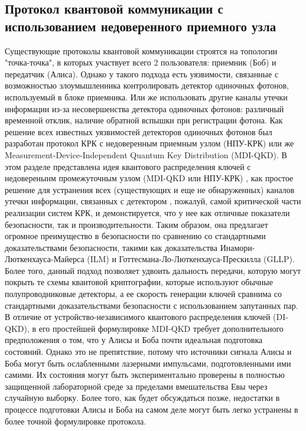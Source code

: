 \subsection{Протокол квантовой коммуникации с использованием недоверенного приемного узла} \label{sec:ch1/sect2/MDI QKD}
Существующие протоколы квантовой коммуникации строятся на топологии "точка-точка", в которых участвует всего 2 пользователя: приемник (Боб) и передатчик (Алиса). Однако у такого подхода есть уязвимости, связанные  с возможностью злоумышленника контролировать детектор одиночных фотонов, используемый в блоке приемника. \cite{makarov2009} Или же использовать другие каналы утечки информации из-за несовершенства детектора одиночных фотонов: различный временной отклик, наличие обратной вспышки при регистрации фотона. \cite{makarov2006,pinheiro2018} Как решение всех известных уязвимостей детекторов одиночных фотонов был разработан протокол КРК с недоверенным приемным узлом (НПУ-КРК) или же Measurement-Device-Independent Quantum Key Distribution (MDI-QKD). 
\newline В этом разделе представлена идея квантового распределения ключей с недоверенынм промежуточным узлом (MDI-QKD или НПУ-КРК) \cite{lo2012,liu2013}, как простое решение для устранения всех (существующих и еще не обнаруженных) каналов утечки информации, связанных с детектором \cite{zhao2008}, пожалуй, самой критической части реализации систем КРК, и демонстируется, что у нее как отличные показатели безопасности, так и производительности. Таким образом, она предлагает огромное преимущество в безопасности по сравнению со стандартными доказательствами безопасности, такими как доказательства Инамори-Люткенхауса-Майерса (ILM) \cite{inamori2007} и Готтесмана-Ло-Люткенхауса-Прескилла (GLLP). \cite{gottesman2004} Более того, данный подход позволяет удвоить дальность передачи, которую могут покрыть те схемы квантовой криптографии, которые используют обычные полупроводниковые детекторы, а ее скорость генерации ключей сравнима со стандартными доказательствами безопасности с использованием запутанных пар. В отличие от устройство-независимого квантового распределения ключей  (DI-QKD), в его простейшей формулировке MDI-QKD требует дополнительного предположения о том, что у Алисы и Боба почти идеальная подготовка состояний. Однако это не препятствие, потому что источники сигнала Алисы и Боба могут быть ослабленными лазерными импульсами, подготовленными ими самими. Их состояния могут быть экспериментально проверены в полностью защищенной лабораторной среде за пределами вмешательства Евы через случайную выборку. Более того, как будет обсуждаться позже, недостатки в процессе подготовки Алисы и Боба на самом деле могут быть легко устранены в более точной формулировке протокола.
